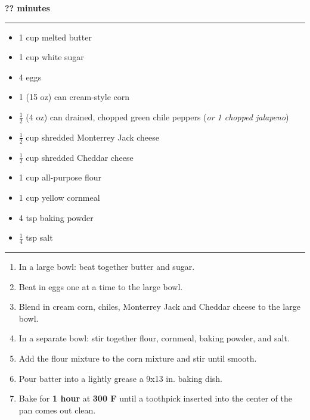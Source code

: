  \hfill {\large \textbf{?? minutes}}

\vspace{15pt} \hrule \vspace{15pt}
\begin{itemize}
	\item 1 cup melted butter
	\item 1 cup white sugar
	\item 4 eggs
	\item 1 (15 oz) can cream-style corn
	\item $\frac{1}{2}$ (4 oz) can drained, chopped green chile peppers (\textit{or 1 chopped jalapeno})
	\item $\frac{1}{2}$ cup shredded Monterrey Jack cheese
	\item $\frac{1}{2}$ cup shredded Cheddar cheese
	\item 1 cup all-purpose flour
	\item 1 cup yellow cornmeal
	\item 4 tsp baking powder
	\item $\frac{1}{4}$ tsp salt
\end{itemize}

\vspace{15pt} \hrule \vspace{15pt}
\begin{enumerate}
	\item In a large bowl: beat together butter and sugar.
	\item Beat in eggs one at a time to the large bowl.
	\item Blend in cream corn, chiles, Monterrey Jack and Cheddar cheese to the large bowl.
	\item In a separate bowl: stir together flour, cornmeal, baking powder, and salt.
	\item Add the flour mixture to the corn mixture and stir until smooth.
	\item Pour batter into a lightly grease a 9x13 in. baking dish.
	\item Bake for \textbf{1 hour} at \textbf{300 F} until a toothpick inserted into the center of the pan comes out clean.
\end{enumerate}
